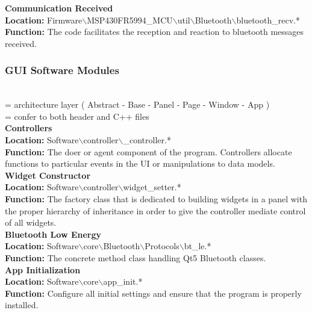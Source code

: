 \documentclass[12pt]{article}
\newcommand{\cross}[1][1pt]{\ooalign{ 	%
  \rule[1ex]{1ex}{#1}\cr%
  \hss\rule{#1}{.7em}\hss\cr}}%
\begin{document}
 \hfill
\pagebreak
\hfill

 \noindent
\textbf{
Communication Received \\
Location: 
}
\space Firmware$\backslash$MSP430FR5994\_MCU$\backslash$util$\backslash$Bluetooth$\backslash$bluetooth\_recv.*\\
\textbf{
Function: }
The code facilitates the reception and reaction to bluetooth messages received.  

\subsubsection{GUI Software Modules} \hfill \\

\noindent
\space \cross[0.4pt]\cross[0.4pt]\cross[0.4pt] = architecture layer ( Abstract - Base - Panel - Page - Window - App )\\
\space * = confer to both header and C++ files\\
 
 \noindent
\textbf{
Controllers\\
Location: }
Software$\backslash$controller$\backslash$\cross[0.4pt]\cross[0.4pt]\cross[0.4pt]\_controller.*\\
\textbf{
Function: }
The doer or agent component of the program.  Controllers allocate functions to particular events in the UI or manipulations to data models.\\
 
 \noindent
\textbf{
Widget Constructor\\
Location: }
Software$\backslash$controller$\backslash$widget\_setter.*\\
\textbf{
Function: }
The factory class that is dedicated to building widgets in a panel with the proper hierarchy of inheritance in order to give the controller mediate control of all widgets.\\
 
 \noindent
\textbf{
Bluetooth Low Energy\\
Location: }
Software$\backslash$core$\backslash$Bluetooth$\backslash$Protocols$\backslash$bt\_le.*\\
\textbf{
Function: }
The concrete method class handling Qt5 Bluetooth classes.\\
 
 \noindent
\textbf{
App Initialization\\
Location: }
Software$\backslash$core$\backslash$app\_init.*\\
\textbf{
Function: }
Configure all initial settings and ensure that the program is properly installed.\\
 
\end{document}
